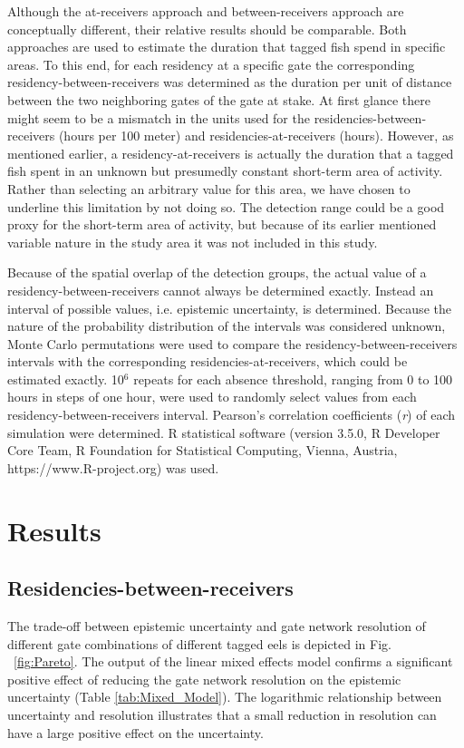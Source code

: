 \documentclass[preprint,12pt,authoryear]{elsarticle}
\begin{document}
\begin{spacing}{1.9}
Although the at-receivers approach and between-receivers approach are conceptually different, their relative results should be comparable. Both approaches are used to estimate the duration that tagged fish spend in specific areas. To this end, for each residency at a specific gate the corresponding residency-between-receivers was determined as the duration per unit of distance between the two neighboring gates of the gate at stake. At first glance there might seem to be a mismatch in the units used for the residencies-between-receivers (hours per 100 meter) and residencies-at-receivers (hours). However, as mentioned earlier, a residency-at-receivers is actually the duration that a tagged fish spent in an unknown but presumedly constant short-term area of activity. Rather than selecting an arbitrary value for this area, we have chosen to underline this limitation by not doing so. The detection range could be a good proxy for the short-term area of activity, but because of its earlier mentioned variable nature in the study area it was not included in this study. 

Because of the spatial overlap of the detection groups, the actual value of a residency-between-receivers cannot always be determined exactly. Instead an interval of possible values, i.e. epistemic uncertainty, is determined. Because the nature of the probability distribution of the intervals was considered unknown, Monte Carlo permutations were used to compare the residency-between-receivers intervals with the corresponding residencies-at-receivers, which could be estimated exactly. 10$^{6}$ repeats for each absence threshold, ranging from 0 to 100 hours in steps of one hour, were used to randomly select values from each residency-between-receivers interval. Pearson's correlation coefficients (\textit{r}) of each simulation were determined. R statistical software (version 3.5.0, R Developer Core Team, R Foundation for Statistical Computing, Vienna, Austria, https://www.R-project.org) was used.  

\section{Results}

\subsection{Residencies-between-receivers}

The trade-off between epistemic uncertainty and gate network resolution of different gate combinations of different tagged eels is depicted in Fig. ~\ref{fig:Pareto}. The output of the linear mixed effects model confirms a significant positive effect of reducing the gate network resolution on the epistemic uncertainty (Table \ref{tab:Mixed_Model}). The logarithmic relationship between uncertainty and resolution illustrates that a small reduction in resolution can have a large positive effect on the uncertainty.


\end{spacing}
\end{document}
